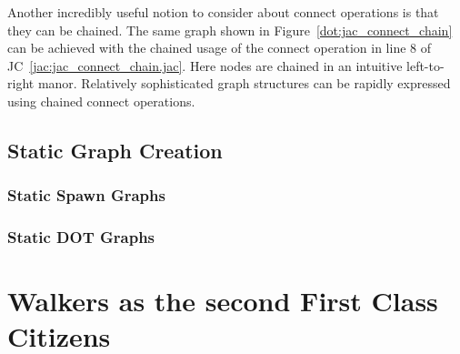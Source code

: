 \par
{}
\par
{}

\par
{}
\par
{}

Another incredibly useful notion to consider about connect operations is that they can be chained.
The same graph shown in Figure~\ref{dot:jac_connect_chain} can be achieved with the chained usage of the connect operation in line 8 of JC~\ref{jac:jac_connect_chain.jac}. Here nodes are chained in an intuitive left-to-right manor. Relatively sophisticated graph structures can be rapidly expressed using chained connect operations.

\subsection{Static Graph Creation}

\subsubsection{Static Spawn Graphs}
\par
{}

\par
{}


\subsubsection{Static DOT Graphs}
\par
{}
\par
{}
\par
{}
\par
{}




\section{Walkers as the second First Class Citizens}

